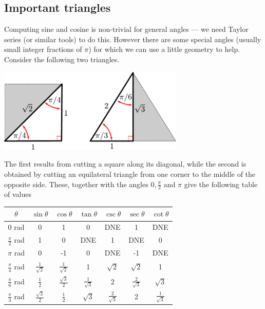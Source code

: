 \subsection{Important triangles}
Computing sine and cosine is non-trivial for general angles --- we need Taylor series (or
similar tools) to do this. However there are some special angles (usually small
integer fractions of $\pi$) for which we can use a little geometry to help. Consider the
following two triangles.
\begin{center}
  \includegraphics[height=4cm]{special_triangles}
\end{center}
The first results from cutting a square along its diagonal, while the second is obtained
by cutting an equilateral triangle from one corner to the middle of the opposite side.
These, together with the angles $0,\frac{\pi}{2}$ and $\pi$ give the following table of
values
\begin{center}
\renewcommand{\arraystretch}{1.3}
     \begin{tabular}{|c||c|c|c||c|c|c|}
          \hline
         $\theta$ & $\sin\theta$ & $\cos\theta$ & $\tan\theta$  &
                    $\csc\theta$ & $\sec\theta$ & $\cot\theta$   \\  \hline\hline
        $0$ rad & 0 & 1 & 0 & DNE & 1 & DNE  \\ \hline
        $\tfrac{\pi}{2}$ rad  & 1 & 0  & DNE & 1& DNE & 0 \\ \hline
        $\pi$ rad & 0 & -1 & 0 & DNE & -1 & DNE \\ \hline\hline
         $\tfrac{\pi}{4}$ rad &
            $\tfrac{1}{\sqrt{2}}$ & $\tfrac{1}{\sqrt{2}}$ & 1 &
            $\sqrt{2}$ & $\sqrt{2}$ & 1 \\ \hline\hline
        $\tfrac{\pi}{6}$ rad &
            $\tfrac{1}{2}$ & $\tfrac{\sqrt{3}}{2}$ & $\tfrac{1}{\sqrt{3}}$ &
            2 & $\tfrac{2}{\sqrt{3}}$ & $\sqrt{3}$  \\ \hline
        $\tfrac{\pi}{3}$ rad &
            $\tfrac{\sqrt{3}}{2}$ & $\tfrac{1}{2}$ & $\sqrt{3}$ &
            $\tfrac{2}{\sqrt{3}}$ &  2 & $\tfrac{1}{\sqrt{3}}$  \\ \hline
     \end{tabular}
\renewcommand{\arraystretch}{1.0}
\end{center}




